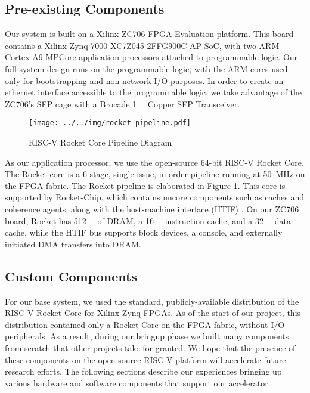 \subsection{Pre-existing Components}
    Our system is built on a Xilinx ZC706 FPGA Evaluation platform. This board
    contains a Xilinx Zynq-7000 XC7Z045-2FFG900C AP SoC, with two ARM Cortex-A9
    MPCore application processors attached to programmable logic. Our full-system
    design runs on the programmable logic, with the ARM cores used only for 
    bootstrapping and non-network I/O purposes. In order to create an ethernet interface accessible
    to the programmable logic, we take advantage of the ZC706's SFP cage with a 
    Brocade \SI{1}{\giga\bit} Copper SFP Transceiver.

    
\begin{figure}[t]
\begin{center}
\texttt{[image: ../../img/rocket-pipeline.pdf]}
\caption{RISC-V Rocket Core Pipeline Diagram}
\label{fig:rocketpipe}
\end{center}
\end{figure}


    As our application processor, we use the open-source 64-bit RISC-V Rocket Core.
    The Rocket core is a
    6-stage, single-issue, in-order pipeline running at \SI{50}{\mega\hertz} on the FPGA fabric. The
    Rocket pipeline is elaborated in Figure \ref{fig:rocketpipe}. This 
    core is supported by Rocket-Chip, which contains uncore components such as
    caches and coherence agents, along with the host-machine interface (HTIF) \cite{rocket}.
    On our ZC706 board, Rocket has \SI{512}{\mebi\byte} of DRAM, a \SI{16}{\kibi\byte} instruction cache, and a
    \SI{32}{\kibi\byte} data cache, while the HTIF bus supports block devices, a console, and
    externally initiated DMA transfers into DRAM.

\subsection{Custom Components}
    For our base system, we used the standard, publicly-available 
    distribution of the RISC-V Rocket Core for Xilinx Zynq FPGAs. As of the 
    start of our project, this distribution contained only a Rocket Core on
    the FPGA fabric, without I/O peripherals. As a result, during our bringup phase 
    we built many components from scratch that other projects take for granted. We hope that
    the presence of these components on the open-source RISC-V platform
    will accelerate future research efforts. The following sections describe our
    experiences bringing up various hardware and software components that support
    our accelerator.

